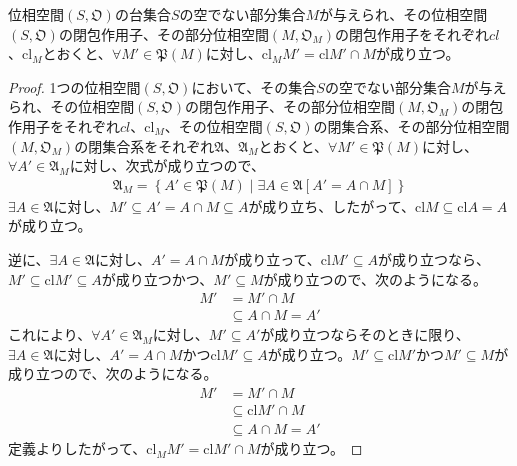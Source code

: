 \documentclass[dvipdfmx]{jsarticle}
\begin{document}
\begin{thm}\label{8.1.4.9}
位相空間$\left( S,\mathfrak{O} \right)$の台集合$S$の空でない部分集合$M$が与えられ、その位相空間$\left( S,\mathfrak{O} \right)$の閉包作用子、その部分位相空間$\left( M,\mathfrak{O}_{M} \right)$の閉包作用子をそれぞれ$cl$、${\mathrm{cl}}_{M}$とおくと、$\forall M'\in \mathfrak{P}(M)$に対し、${\mathrm{cl}}_{M}M' = {\mathrm{cl}}M' \cap M$が成り立つ。
\end{thm}
\begin{proof}
1つの位相空間$\left( S,\mathfrak{O} \right)$において、その集合$S$の空でない部分集合$M$が与えられ、その位相空間$\left( S,\mathfrak{O} \right)$の閉包作用子、その部分位相空間$\left( M,\mathfrak{O}_{M} \right)$の閉包作用子をそれぞれ$cl$、${\mathrm{cl}}_{M}$、その位相空間$\left( S,\mathfrak{O} \right)$の閉集合系、その部分位相空間$\left( M,\mathfrak{O}_{M} \right)$の閉集合系をそれぞれ$\mathfrak{A}$、$\mathfrak{A}_{M}$とおくと、$\forall M'\in \mathfrak{P}(M)$に対し、$\forall A' \in \mathfrak{A}_{M}$に対し、次式が成り立つので、
\begin{align*}
\mathfrak{A}_{M} = \left\{ A'\in \mathfrak{P}(M) \middle| \exists A \in \mathfrak{A}\left[ A' = A \cap M \right] \right\}
\end{align*}
$\exists A \in \mathfrak{A}$に対し、$M' \subseteq A' = A \cap M \subseteq A$が成り立ち、したがって、${\mathrm{cl}}M \subseteq {\mathrm{cl}}A = A$が成り立つ。\par
逆に、$\exists A \in \mathfrak{A}$に対し、$A' = A \cap M$が成り立って、${\mathrm{cl}}M' \subseteq A$が成り立つなら、$M' \subseteq {\mathrm{cl}}M' \subseteq A$が成り立つかつ、$M' \subseteq M$が成り立つので、次のようになる。
\begin{align*}
M' &= M' \cap M\\
&\subseteq A \cap M = A'
\end{align*}
これにより、$\forall A' \in \mathfrak{A}_{M}$に対し、$M' \subseteq A'$が成り立つならそのときに限り、$\exists A \in \mathfrak{A}$に対し、$A' = A \cap M$かつ${\mathrm{cl}}M' \subseteq A$が成り立つ。$M' \subseteq {\mathrm{cl}}M'$かつ$M' \subseteq M$が成り立つので、次のようになる。
\begin{align*}
M' &= M' \cap M\\
&\subseteq {\mathrm{cl}}M' \cap M\\
&\subseteq A \cap M = A'
\end{align*}
定義よりしたがって、${\mathrm{cl}}_{M}M' = {\mathrm{cl}}M' \cap M$が成り立つ。
\end{proof}
\end{document}
